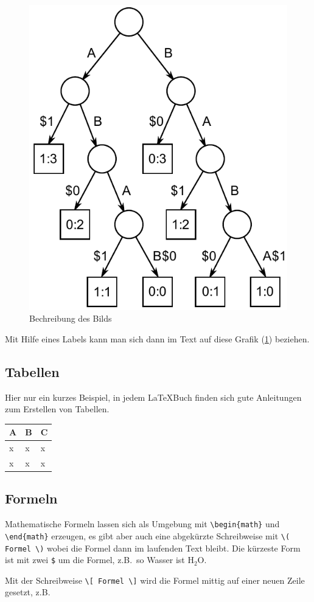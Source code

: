 \begin{figure}[ht]
\centering
\includegraphics[width=.4\textwidth]{images/Suffix_tree_ABAB_BABA}
\caption{\label{anker}Bechreibung des Bilds}
\end{figure}

Mit Hilfe eines Labels kann man sich dann im Text auf diese Grafik (\ref{anker}) beziehen. 


\subsection{Tabellen}

Hier nur ein kurzes Beispiel, in jedem \LaTeX Buch finden sich gute Anleitungen zum Erstellen von Tabellen.

\begin{table}[h]
\begin{center}
\begin{tabular}{|l|l|l|}
	A & B & C \\\hline
	x & x & x \\
	x & x & x
\end{tabular}
\end{center}
\end{table}


\subsection{Formeln}

Mathematische Formeln lassen sich als Umgebung mit \verb|\begin{math}| und \verb|\end{math}| erzeugen, es gibt aber auch eine abgekürzte Schreibweise mit \verb|\( Formel \)| wobei die Formel dann im laufenden Text bleibt. Die kürzeste Form ist mit zwei \verb|$| um die Formel, z.B.~so Wasser ist H$_2$O.

Mit der Schreibweise \verb|\[ Formel \]| wird die Formel mittig auf einer neuen Zeile gesetzt, z.B.

